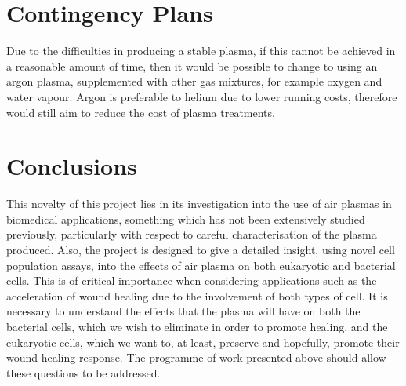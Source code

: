 \documentclass[11pt, oneside]{article}   	%
\begin{document}

\section*{Contingency Plans}
Due to the difficulties in producing a stable plasma, if this cannot be achieved in a reasonable amount of time, then it would be possible to change to using an argon plasma, supplemented with other gas mixtures, for example oxygen and water vapour. 
Argon is preferable to helium due to lower running costs, therefore would still aim to reduce the cost of plasma treatments.

\section*{Conclusions}
This novelty of this project lies in its investigation into the use of air plasmas in biomedical applications, something which has not been extensively studied previously, particularly with respect to careful characterisation of the plasma produced. Also, the project is designed to give a detailed insight, using novel cell population assays, into the effects of air plasma on both eukaryotic and bacterial cells. This is of critical importance when considering applications such as the acceleration of wound healing due to the involvement of both types of cell. It is necessary to understand the effects that the plasma will have on both the bacterial cells, which we wish to eliminate in order to promote healing, and the eukaryotic cells, which we want to, at least, preserve and hopefully, promote their wound healing response. The programme of work presented above should allow these questions to be addressed.






\end{document}
